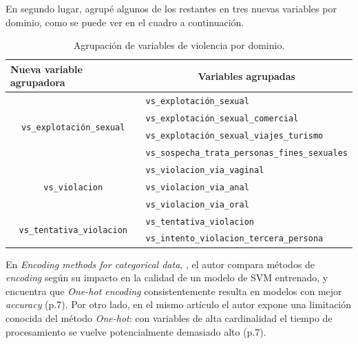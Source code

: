 \documentclass[10 pt]{article}
\begin{document}
En segundo lugar, agrupé algunos de los restantes en tres nuevas variables por dominio, como se puede ver en el cuadro  a continuación.

\begin{table}[H]
    \centering
    \caption{Agrupación de variables de violencia por dominio.}
    \label{tablaagrup}
    \begin{tabular}{|c|l|}
    \hline
    \multicolumn{1}{|l|}{\textbf{Nueva variable agrupadora}} & \multicolumn{1}{c|}{\textbf{Variables agrupadas}} \\ \hline
    \multirow{4}{*}{\texttt{vs\_explotación\_sexual}}                 & \texttt{vs\_explotación\_sexual}                           \\ \cline{2-2} 
    & \texttt{vs\_explotación\_sexual\_comercial}                \\ \cline{2-2} 
    & \texttt{vs\_explotación\_sexual\_viajes\_turismo}          \\ \cline{2-2} 
    & \texttt{vs\_sospecha\_trata\_personas\_fines\_sexuales}    \\ \hline
\multirow{3}{*}{\texttt{vs\_violacion}}                          & \texttt{vs\_violacion\_via\_vaginal}                      \\ \cline{2-2} 
    & \texttt{vs\_violacion\_via\_anal}                         \\ \cline{2-2} 
    & \texttt{vs\_violacion\_via\_oral}                         \\ \hline
\multirow{2}{*}{\texttt{vs\_tentativa\_violacion}}                & \texttt{vs\_tentativa\_violacion}                     \\ \cline{2-2} 
    & \texttt{vs\_intento\_violacion\_tercera\_persona}           \\ \hline

    \end{tabular}
    \end{table}



En \textit{Encoding methods for categorical data}, \citep{udilua2023encoding}, el autor compara métodos de \textit{encoding} según su impacto en la calidad de un modelo de SVM entrenado, y encuentra que \textit{One-hot encoding} consistentemente resulta en modelos con mejor \textit{accuracy} (p.7). Por otro lado, en el mismo artículo el autor expone una limitación conocida del método \textit{One-hot}: con variables de alta cardinalidad el tiempo de procesamiento se vuelve potencialmente demasiado alto (p.7).
\end{document}
